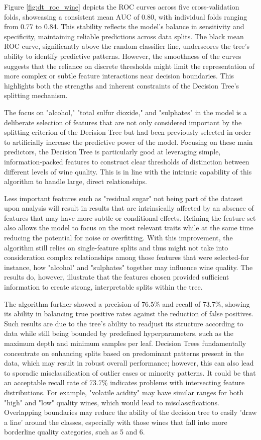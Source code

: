 \documentclass[conference]{IEEEtran}
\begin{document}
Figure \ref{fig:dt_roc_wine} depicts the ROC curves across five cross-validation folds, showcasing a consistent mean AUC of 0.80, with individual folds ranging from 0.77 to 0.84. This stability reflects the model's balance in sensitivity and specificity, maintaining reliable predictions across data splits. The black mean ROC curve, significantly above the random classifier line, underscores the tree's ability to identify predictive patterns. However, the smoothness of the curves suggests that the reliance on discrete thresholds might limit the representation of more complex or subtle feature interactions near decision boundaries. This highlights both the strengths and inherent constraints of the Decision Tree's splitting mechanism.

The focus on "alcohol," "total sulfur dioxide," and "sulphates" in the model is a deliberate selection of features that are not only considered important by the splitting criterion of the Decision Tree but had been previously selected in order to artificially increase the predictive power of the model. Focusing on these main predictors, the Decision Tree is particularly good at leveraging simple, information-packed features to construct clear thresholds of distinction between different levels of wine quality. This is in line with the intrinsic capability of this algorithm to handle large, direct relationships.

Less important features such as "residual sugar" not being part of the dataset upon analysis will result in results that are intrinsically affected by an absence of features that may have more subtle or conditional effects. Refining the feature set also allows the model to focus on the most relevant traits while at the same time reducing the potential for noise or overfitting. With this improvement, the algorithm still relies on single-feature splits and thus might not take into consideration complex relationships among those features that were selected-for instance, how "alcohol" and "sulphates" together may influence wine quality. The results do, however, illustrate that the features chosen provided sufficient information to create strong, interpretable splits within the tree.

The algorithm further showed a precision of 76.5\% and recall of 73.7\%, showing its ability in balancing true positive rates against the reduction of false positives. Such results are due to the tree's ability to readjust its structure according to data while still being bounded by predefined hyperparameters, such as the maximum depth and minimum samples per leaf. Decision Trees fundamentally concentrate on enhancing splits based on predominant patterns present in the data, which may result in robust overall performance; however, this can also lead to sporadic misclassification of outlier cases or minority patterns. It could be that an acceptable recall rate of 73.7\% indicates problems with intersecting feature distributions. For example, "volatile acidity" may have similar ranges for both "high" and "low" quality wines, which would lead to misclassifications. Overlapping boundaries may reduce the ability of the decision tree to easily 'draw a line' around the classes, especially with those wines that fall into more borderline quality categories, such as 5 and 6.
\end{document}
